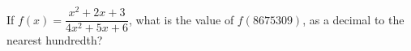 If $f(x)=\dfrac{x^2+2x+3}{4x^2+5x+6}$, what is the value of $f(8675309)$, as a decimal to the nearest hundredth?
